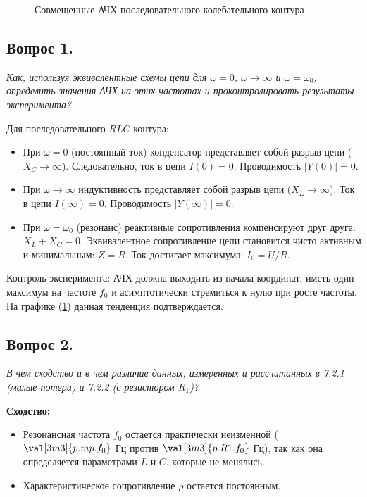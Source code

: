 \begin{figure}[H]
    \centering
    
    \caption{Совмещенные АЧХ последовательного колебательного контура}
    \label{fig:ach_combined}
\end{figure}

\subsection*{Вопрос 1.}
\textit{Как, используя эквивалентные схемы цепи для $\omega = 0$, $\omega \to \infty$ и $\omega = \omega_0$, определить значения АЧХ на этих частотах и проконтролировать результаты эксперимента?}

Для последовательного $RLC$-контура:
\begin{itemize}
    \item При $\omega = 0$ (постоянный ток) конденсатор представляет собой разрыв цепи ($X_C \to \infty$). Следовательно, ток в цепи $I(0) = 0$. Проводимость $|Y(0)| = 0$.
    \item При $\omega \to \infty$ индуктивность представляет собой разрыв цепи ($X_L \to \infty$). Ток в цепи $I(\infty) = 0$. Проводимость $|Y(\infty)| = 0$.
    \item При $\omega = \omega_0$ (резонанс) реактивные сопротивления компенсируют друг друга: $X_L + X_C = 0$. Эквивалентное сопротивление цепи становится чисто активным и минимальным: $Z = R$. Ток достигает максимума: $I_0 = U/R$.
\end{itemize}
Контроль эксперимента: АЧХ должна выходить из начала координат, иметь один максимум на частоте $f_0$ и асимптотически стремиться к нулю при росте частоты. На графике (\cref{fig:ach_combined}) данная тенденция подтверждается.

\subsection*{Вопрос 2.}
\textit{В чем сходство и в чем различие данных, измеренных и рассчитанных в 7.2.1 (малые потери) и 7.2.2 (с резистором $R_1$)?}

\textbf{Сходство:}
\begin{itemize}
    \item Резонансная частота $f_0$ остается практически неизменной ($\val[3m3]{p.mp.f_0}$ Гц против $\val[3m3]{p.R1.f_0}$ Гц), так как она определяется параметрами $L$ и $C$, которые не менялись.
    \item Характеристическое сопротивление $\rho$ остается постоянным.
\end{itemize}

